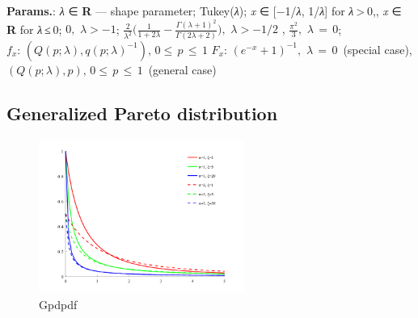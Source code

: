     {\color{darkblue} \textbf{Params.}:} {\textit{λ} ∈ \textbf{R} — shape parameter}; {Tukey(\textit{λ})}; {\textit{x} ∈ [−1/\textit{λ}, 1/\textit{λ}] for \textit{λ} > 0,, \textit{x} ∈ \textbf{R} for \textit{λ} ≤ 0}; {$0,\,\,\lambda > -1$}; {$\frac{2}{\lambda^2}\bigg(\frac{1}{1+2\lambda}-\frac{\Gamma(\lambda+1)^2}{\Gamma(2\lambda+2)}\bigg),\,\,\lambda > -1/2$ ,  $\frac{ \pi^{2} }{ 3 },\,\,\lambda\,=\,0$};\hspace{0.5cm}\\{\color{darkblue} \textbf{$f_x$}:} {$(Q(p;\lambda),q(p;\lambda)^{-1}),\, 0\leq\,p\,\leq\,1$}{\color{darkblue} \textbf{$F_x$}:} {$(e^{-x}+1)^{-1},\,\,\lambda\,=\,0\,$ (special case),  $(Q(p;\lambda),p),\, 0\leq\,p\,\leq\,1\,$ (general case)}



    
        
\subsection{Generalized Pareto distribution}


    \begin{figure}[H]
        \centering
        \includegraphics[width=0.6\textwidth]{images/Gpdpdf.png}
        \caption{Gpdpdf}
    \end{figure}




